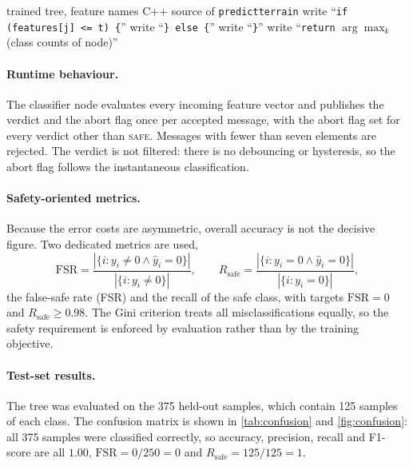 \documentclass[11pt,a4paper]{article}
\DeclareRobustCommand{\code}[1]{{\let\_\codeus\texttt{#1}}}
\newcommand{\codeus}{\textunderscore\allowbreak{}}
\begin{document}
\begin{algorithm}[ht]
\caption{Generation of the inference code from a trained tree}\label{alg:codegen}
\begin{algorithmic}[1]
\Require trained tree, feature names
\Ensure C++ source of \code{predict\_terrain}
    \State write ``\code{if (features[j] <= t) \{}''
    \State {}
    \State write ``\code{\} else \{}''
    \State {}
    \State write ``\code{\}}''
  \Else
    \State write ``\code{return} $\arg\max_k$ (class counts of node)''
  \EndIf
\EndFunction
\end{algorithmic}
\end{algorithm}
 
\paragraph{Runtime behaviour.} The classifier node evaluates every incoming feature vector and publishes the verdict and the abort flag once per accepted message, with the abort flag set for every verdict other than \textsc{safe}. Messages with fewer than seven elements are rejected. The verdict is not filtered: there is no debouncing or hysteresis, so the abort flag follows the instantaneous classification.
 
\paragraph{Safety-oriented metrics.} Because the error costs are asymmetric, overall accuracy is not the decisive figure. Two dedicated metrics are used,
\begin{equation}
\mathrm{FSR}=\frac{|\{i:y_i\neq0\wedge\hat y_i=0\}|}{|\{i:y_i\neq0\}|},\qquad
R_{\mathrm{safe}}=\frac{|\{i:y_i=0\wedge\hat y_i=0\}|}{|\{i:y_i=0\}|},
\end{equation}
the false-safe rate (FSR) and the recall of the safe class, with targets $\mathrm{FSR}=0$ and $R_{\mathrm{safe}}\ge0.98$. The Gini criterion treats all misclassifications equally, so the safety requirement is enforced by evaluation rather than by the training objective.
 
\paragraph{Test-set results.} The tree was evaluated on the 375 held-out samples, which contain 125 samples of each class. The confusion matrix is shown in \cref{tab:confusion} and \cref{fig:confusion}: all 375 samples were classified correctly, so accuracy, precision, recall and F1-score are all $1.00$, $\mathrm{FSR}=0/250=0$ and $R_{\mathrm{safe}}=125/125=1$.
 
\end{document}
